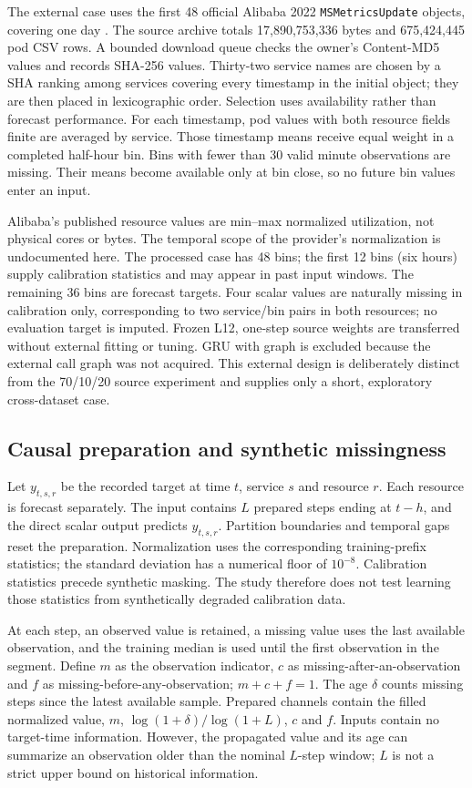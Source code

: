 The external case uses the first 48 official Alibaba 2022 \texttt{MSMetricsUpdate} objects, covering one day \cite{alibaba2022}. The source archive totals 17,890,753,336 bytes and 675,424,445 pod CSV rows. A bounded download queue checks the owner's Content-MD5 values and records SHA-256 values. Thirty-two service names are chosen by a SHA ranking among services covering every timestamp in the initial object; they are then placed in lexicographic order. Selection uses availability rather than forecast performance. For each timestamp, pod values with both resource fields finite are averaged by service. Those timestamp means receive equal weight in a completed half-hour bin. Bins with fewer than 30 valid minute observations are missing. Their means become available only at bin close, so no future bin values enter an input.

Alibaba's published resource values are min--max normalized utilization, not physical cores or bytes. The temporal scope of the provider's normalization is undocumented here. The processed case has 48 bins; the first 12 bins (six hours) supply calibration statistics and may appear in past input windows. The remaining 36 bins are forecast targets. Four scalar values are naturally missing in calibration only, corresponding to two service/bin pairs in both resources; no evaluation target is imputed. Frozen L12, one-step source weights are transferred without external fitting or tuning. GRU with graph is excluded because the external call graph was not acquired. This external design is deliberately distinct from the 70/10/20 source experiment and supplies only a short, exploratory cross-dataset case.

\subsection{Causal preparation and synthetic missingness}
Let $y_{t,s,r}$ be the recorded target at time $t$, service $s$ and resource $r$. Each resource is forecast separately. The input contains $L$ prepared steps ending at $t-h$, and the direct scalar output predicts $y_{t,s,r}$. Partition boundaries and temporal gaps reset the preparation. Normalization uses the corresponding training-prefix statistics; the standard deviation has a numerical floor of $10^{-8}$. Calibration statistics precede synthetic masking. The study therefore does not test learning those statistics from synthetically degraded calibration data.

At each step, an observed value is retained, a missing value uses the last available observation, and the training median is used until the first observation in the segment. Define $m$ as the observation indicator, $c$ as missing-after-an-observation and $f$ as missing-before-any-observation; $m+c+f=1$. The age $\delta$ counts missing steps since the latest available sample. Prepared channels contain the filled normalized value, $m$, $\log(1+\delta)/\log(1+L)$, $c$ and $f$. Inputs contain no target-time information. However, the propagated value and its age can summarize an observation older than the nominal $L$-step window; $L$ is not a strict upper bound on historical information.

